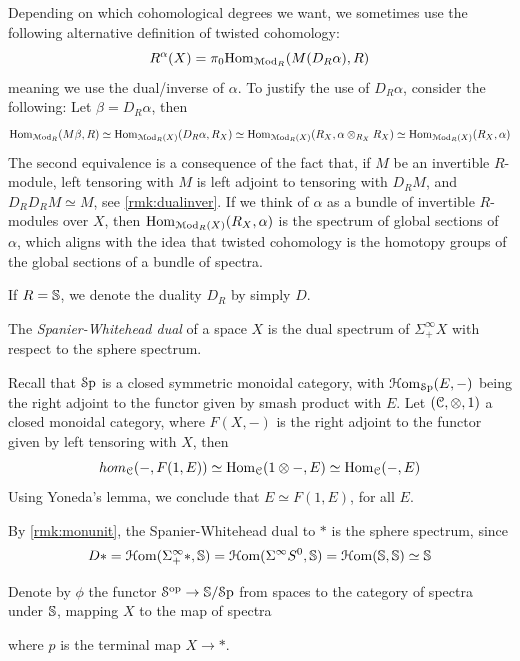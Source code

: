 \documentclass[10pt]{amsart}
\begin{document}
\begin{remark} Depending on which cohomological degrees we want, we sometimes use the following alternative definition of	twisted cohomology:
	\[ R^{\alpha}(X) =\pi_0\mathrm{Hom}_{\mathcal{M}\mathrm{od}_R}(M(D_R\alpha), R) \]
 meaning we use the dual/inverse of $\alpha$. To justify the use of $D_R\alpha$, consider the following: Let $\beta=D_R\alpha$, then
 \[\mathrm{Hom}_{\mathcal{M}\mathrm{od}_R}(M\beta,R)\simeq\mathrm{Hom}_{\mathcal{M}\mathrm{od}_{R}(X)}(D_R\alpha,R_X)\simeq\mathrm{Hom}_{\mathcal{M}\mathrm{od}_R(X)}(R_X,\alpha\otimes_{R_X}R_X)\simeq\mathrm{Hom}_{\mathcal{M}\mathrm{od}_R(X)}(R_X,\alpha)\]The second equivalence is a consequence of the fact that, if $M$ be an invertible $R$-module, left tensoring with $M$ is left adjoint to tensoring with $D_RM$, and $D_RD_RM\simeq M$, see \cref{rmk:dualinver}. If we think of $\alpha$ as a bundle of invertible $R$-modules over $X$, then $\mathrm{Hom}_{\mathcal{M}\mathrm{od}_R(X)}(R_X,\alpha)$ is the spectrum of global sections of $\alpha$, which aligns with the idea that {twisted cohomology is the homotopy groups of the global sections of a bundle of spectra}. 
\end{remark}
If $R=\mathbb{S}$, we denote the duality $D_R$ by simply $D$. 
\begin{definition}
	The \emph{Spanier-Whitehead dual} of a space $X$ is the dual spectrum of $\Sigma^\infty_+X$ with respect to the sphere spectrum.
\end{definition}
\begin{remark}\label{rmk:monunit}
	Recall that $\mathcal{S}\mathrm{p}$ is a closed symmetric monoidal category, with $\mathcal{H}\mathrm{om}_{\mathcal{S}\mathrm{p}}(E,-)$ being the right adjoint to the functor given by smash product with $E$. Let $(\mathcal{C},\otimes,1)$ a closed monoidal category, where $F(X,-)$ is the right adjoint to the functor given by left tensoring with $X$, then \[\\hom_{\mathcal{C}}(-,F(1,E))\simeq\mathrm{Hom}_{\mathcal{C}}(1\otimes-,E)\simeq\mathrm{Hom}_{\mathcal{C}}(-,E)\]Using Yoneda's lemma, we conclude that $E\simeq F(1,E)$, for all $E$. 
\end{remark}
\begin{example}
	By \cref{rmk:monunit}, the Spanier-Whitehead dual to $*$ is the sphere spectrum, since \[D*=\mathcal{H}\mathrm{om}(\Sigma^\infty_+*,\mathbb{S})=\mathcal{H}\mathrm{om}(\Sigma^\infty S^0,\mathbb{S})=\mathcal{H}\mathrm{om}(\mathbb{S},\mathbb{S})\simeq\mathbb{S}\]
\end{example}
\begin{definition}
	Denote by $\phi$ the functor $\mathcal{S}^{\mathrm{op}}\to\mathbb{S}/\mathcal{S}\mathrm{p}$ from spaces to the category of spectra under $\mathbb{S}$, mapping $X$ to the map of spectra \begin{center}
	\end{center}where $p$ is the terminal map $X\to *$.
\end{definition} 
\end{document}
